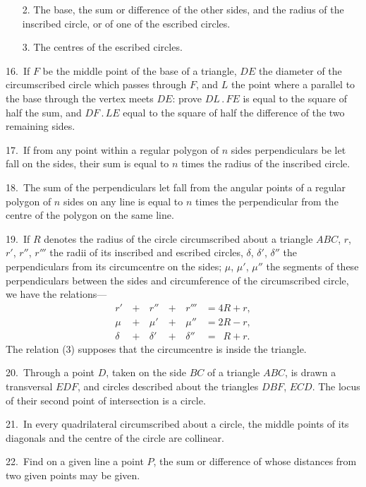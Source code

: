 \documentclass[oneside]{book}
\begin{document}
\begin{footnotesize}
\begin{changemargin}{0.3in}{0in}
\begin{enumerate}
\item[2.] The base, the sum or difference of the other sides, and
the radius of the inscribed circle, or of one of the
escribed circles.

\item[3.] The centres of the escribed circles.
\end{enumerate}
\end{changemargin}

16.~If $F$ be the middle point of the base of a triangle, $DE$ the
diameter of the circumscribed circle which passes through $F$, and
$L$ the point where a parallel to the base through the vertex meets
$DE$: prove $DL\,.\,FE$ is equal to the square of half the sum, and
$DF\,.\,LE$ equal to the square of half the difference of the two remaining
sides.

17.~If from any point within a regular polygon of $n$ sides perpendiculars
be let fall on the sides, their sum is equal to $n$ times
the radius of the inscribed circle.

18.~The sum of the perpendiculars let fall from the angular
points of a regular polygon of $n$ sides on any line is equal to
$n$ times the perpendicular from the centre of the polygon on the
same line.

19.~If $R$ denotes the radius of the circle circumscribed about a
triangle $ABC$, $r$, $r'$, $r''$, $r'''$ the radii of its inscribed and escribed
circles, $\delta$, $\delta'$, $\delta''$ the perpendiculars from its circumcentre on the
sides; $\mu$, $\mu'$, $\mu''$ the segments of these perpendiculars between the
sides and circumference of the circumscribed circle, we have the
relations---
\begin{alignat}{3}
 r' &\,+\, &r'' &\,+\, &r''' &= 4R + r,  \\
 \mu &\,+\, &\mu' &\,+\, &\mu'' &= 2R - r,  \\
 \delta &\,+\, &\delta' &\,+\, &\delta'' &= \phantom{0}R + r.
\end{alignat}
The relation (3) supposes that the circumcentre is inside the
triangle.


20.~Through a point $D$, taken on the side $BC$ of a triangle
$ABC$, is drawn a transversal $EDF$, and circles described about
the triangles $DBF$, $ECD$. The locus of their second point of
intersection is a circle.

21.~In every quadrilateral circumscribed about a circle, the
middle points of its diagonals and the centre of the circle are
collinear.

22.~Find on a given line a point $P$, the sum or difference of
whose distances from two given points may be given.


\end{footnotesize}
\end{document}
